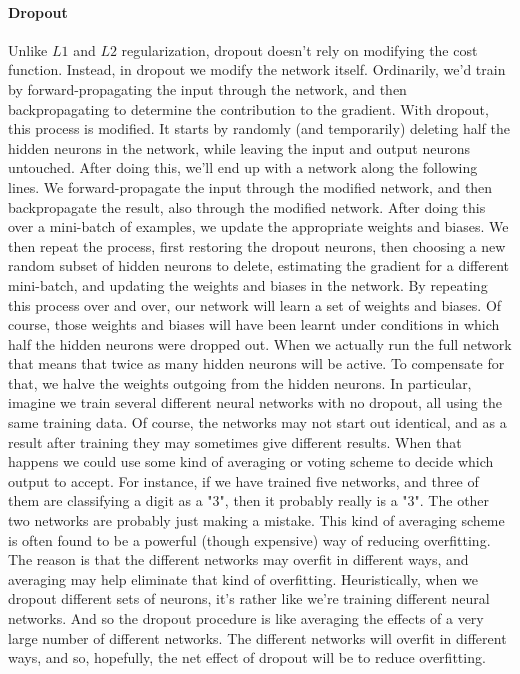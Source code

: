 \documentclass[12pt, letterpaper]{article}
\theoremstyle{definition}
\let\tb\textbf
\begin{document}
\paragraph{\tb{Dropout}} Unlike $L1$ and $L2$ regularization, dropout doesn't rely on modifying the cost function. Instead, in dropout we modify the network itself. Ordinarily, we'd train by forward-propagating the input through the network, and then backpropagating to determine the contribution to the gradient. With dropout, this process is modified. It starts by randomly (and temporarily) deleting half the hidden neurons in the network, while leaving the input and output neurons untouched. After doing this, we'll end up with a network along the following lines. We forward-propagate the input through the modified network, and then backpropagate the result, also through the modified network. After doing this over a mini-batch of examples, we update the appropriate weights and biases. We then repeat the process, first restoring the dropout neurons, then choosing a new random subset of hidden neurons to delete, estimating the gradient for a different mini-batch, and updating the weights and biases in the network. By repeating this process over and over, our network will learn a set of weights and biases. Of course, those weights and biases will have been learnt under conditions in which half the hidden neurons were dropped out. When we actually run the full network that means that twice as many hidden neurons will be active. To compensate for that, we halve the weights outgoing from the hidden neurons. In particular, imagine we train several different neural networks with no dropout, all using the same training data. Of course, the networks may not start out identical, and as a result after training they may sometimes give different results. When that happens we could use some kind of averaging or voting scheme to decide which output to accept. For instance, if we have trained five networks, and three of them are classifying a digit as a "3", then it probably really is a "3". The other two networks are probably just making a mistake. This kind of averaging scheme is often found to be a powerful (though expensive) way of reducing overfitting. The reason is that the different networks may overfit in different ways, and averaging may help eliminate that kind of overfitting. Heuristically, when we dropout different sets of neurons, it's rather like we're training different neural networks. And so the dropout procedure is like averaging the effects of a very large number of different networks. The different networks will overfit in different ways, and so, hopefully, the net effect of dropout will be to reduce overfitting.
\end{document}
